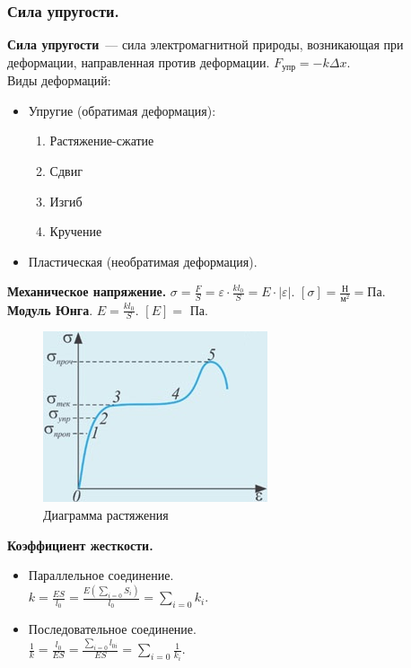 \documentclass{article}
\begin{document}
	\subsubsection{Сила упругости.}
	\textbf{Сила упругости}~--- сила электромагнитной природы, возникающая при деформации, направленная против деформации. $F_{\text{упр}} = -k \varDelta x$. \\
	Виды деформаций:
	\begin{itemize}
		\item Упругие (обратимая деформация):
		\begin{enumerate}
			\item Растяжение-сжатие
			\item Сдвиг
			\item Изгиб
			\item Кручение
		\end{enumerate}
		\item Пластическая (необратимая деформация).
	\end{itemize}
	\textbf{Механическое напряжение.} $\sigma = \frac{F}{S} = \varepsilon \cdot \frac{kl_0}{S} = E \cdot |\varepsilon|$. $[\sigma] = \frac{\text{Н}}{\text{м}^2} = \text{Па}$. \\
	\textbf{Модуль Юнга}. $E = \frac{kl_0}{S}$. $[E] =$ Па. \\
	\begin{figure}[H]
		\includegraphics[height=0.35\textwidth]{extra-materials/Диаграмма-растяжения}
		\caption{Диаграмма растяжения}
	\end{figure}
	\textbf{Коэффициент жесткости.}
	\begin{itemize}
		\item Параллельное соединение. \\
		$k = \frac{ES}{l_0} = \frac{E(\sum_{i = 0} S_i)}{l_0} = \sum_{i = 0} k_i$.
		\item Последовательное соединение. \\
		$\frac{1}{k} = \frac{l_0}{ES} = \frac{\sum_{i = 0} l_{0i}}{ES} = \sum_{i = 0} \frac{1}{k_i}$.
	\end{itemize}
\end{document}
